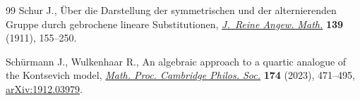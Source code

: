 \begin{thebibliography}{99}
Schur J., \"Uber die {D}arstellung der symmetrischen und der alternierenden
 {G}ruppe durch gebrochene lineare {S}ubstitutionen, \href{https://doi.org/10.1515/crll.1911.139.155}{\textit{J.~Reine Angew.
 Math.}} \textbf{139} (1911), 155--250.

Sch\"urmann J., Wulkenhaar R., An algebraic approach to a quartic analogue of
 the {K}ontsevich model, \href{https://doi.org/10.1017/S0305004122000366}{\textit{Math. Proc. Cambridge Philos. Soc.}}
 \textbf{174} (2023), 471--495, \href{https://arxiv.org/abs/1912.03979}{arXiv:1912.03979}.

\end{thebibliography}\LastPageEnding
